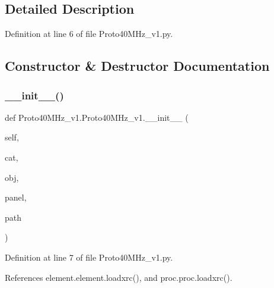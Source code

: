 \subsection{Detailed Description}


Definition at line 6 of file Proto40\+M\+Hz\+\_\+v1.\+py.



\subsection{Constructor \& Destructor Documentation}
\mbox{\label{classProto40MHz__v1_1_1Proto40MHz__v1_af6ae461ea2c763ce3a87c0752e21b3e4}} 
\subsubsection{\texorpdfstring{\+\_\+\+\_\+init\+\_\+\+\_\+()}{\_\_init\_\_()}}
{\footnotesize\ttfamily def Proto40\+M\+Hz\+\_\+v1.\+Proto40\+M\+Hz\+\_\+v1.\+\_\+\+\_\+init\+\_\+\+\_\+ (\begin{DoxyParamCaption}\item[{}]{self,  }\item[{}]{cat,  }\item[{}]{obj,  }\item[{}]{panel,  }\item[{}]{path }\end{DoxyParamCaption})}



Definition at line 7 of file Proto40\+M\+Hz\+\_\+v1.\+py.



References element.\+element.\+loadxrc(), and proc.\+proc.\+loadxrc().


